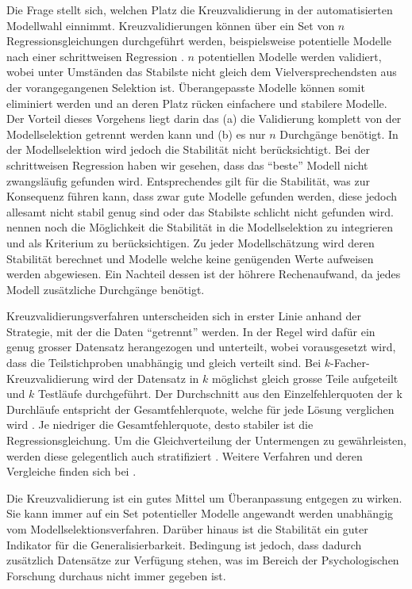 Die Frage stellt sich, welchen Platz die Kreuzvalidierung in der automatisierten Modellwahl einnimmt.
Kreuzvalidierungen können über ein Set von $n$ Regressionsgleichungen durchgeführt werden, beispielsweise  potentielle Modelle nach einer schrittweisen Regression \cite[p. 12]{arlot2010survey}.
$n$ potentiellen Modelle werden validiert, wobei unter Umständen das Stabilste nicht gleich dem Vielversprechendsten aus der vorangegangenen Selektion ist.
Überangepasste Modelle können somit eliminiert werden und an deren Platz rücken einfachere und stabilere Modelle.
Der Vorteil dieses Vorgehens liegt darin das (a) die Validierung komplett von der Modellselektion getrennt werden kann und (b) es nur $n$ Durchgänge benötigt. 
In der Modellselektion wird jedoch die Stabilität nicht berücksichtigt. 
Bei der schrittweisen Regression haben wir gesehen, dass das ``beste'' Modell nicht zwangsläufig gefunden wird.
Entsprechendes gilt für die Stabilität, was zur Konsequenz führen kann, dass zwar gute Modelle gefunden werden, diese jedoch allesamt nicht stabil genug sind oder das Stabilste schlicht nicht gefunden wird. 
 nennen noch die Möglichkeit die Stabilität in die Modellselektion zu integrieren und als  Kriterium zu berücksichtigen. 
Zu jeder Modellschätzung wird deren Stabilität berechnet und Modelle welche keine genügenden Werte aufweisen werden abgewiesen. 
Ein Nachteil dessen ist der höhrere Rechenaufwand, da jedes Modell zusätzliche Durchgänge benötigt. 

Kreuzvalidierungsverfahren unterscheiden sich in erster Linie anhand der Strategie, mit der die Daten ``getrennt'' werden.
In der Regel wird dafür ein genug grosser Datensatz herangezogen und unterteilt, wobei vorausgesetzt wird, dass die Teilstichproben unabhängig und gleich verteilt sind. 
Bei $k$-Facher-Kreuzvalidierung wird der Datensatz in $k$ möglichst gleich grosse Teile aufgeteilt und $k$ Testläufe durchgeführt.
 Der Durchschnitt aus den Einzelfehlerquoten der k Durchläufe entspricht der Gesamtfehlerquote, welche für jede Lösung verglichen wird \cite[p. 14]{arlot2010survey}.
Je niedriger die Gesamtfehlerquote, desto stabiler ist die Regressionsgleichung.
Um die Gleichverteilung der Untermengen zu gewährleisten, werden diese gelegentlich auch stratifiziert \cite{diamantidis2000unsupervised}. 
Weitere Verfahren und deren Vergleiche finden sich bei .

Die Kreuzvalidierung ist ein gutes Mittel um Überanpassung entgegen zu wirken. Sie kann immer auf ein Set potentieller Modelle angewandt werden unabhängig vom Modellselektionsverfahren.
Darüber hinaus ist die Stabilität ein guter Indikator für die Generalisierbarkeit.
Bedingung ist jedoch, dass dadurch zusätzlich Datensätze zur Verfügung stehen, was im Bereich der Psychologischen Forschung durchaus nicht immer gegeben ist. 
